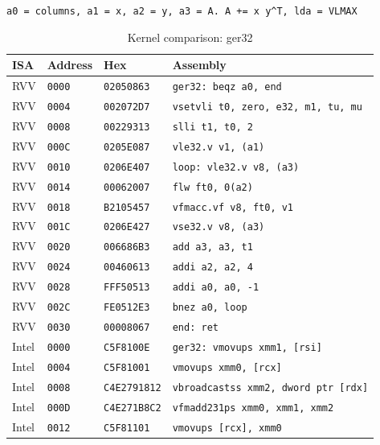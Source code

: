\begin{table}[htbp]
\centering
\caption{Kernel comparison: ger32}
\begingroup
\scriptsize
\setlength{\tabcolsep}{4pt}
\noindent \texttt{a0 = columns, a1 = x, a2 = y, a3 = A. A += x y\textasciicircum{}T, lda = VLMAX}\par
\vspace{0.6ex}
\begin{tabular}{@{}l|l|l|p{7.2cm}@{}}
\toprule
ISA & Address & Hex & Assembly \\
\midrule
RVV & \texttt{0000} & \texttt{02050863} & \texttt{ger32: beqz a0, end} \\
RVV & \texttt{0004} & \texttt{002072D7} & \texttt{vsetvli t0, zero, e32, m1, tu, mu} \\
RVV & \texttt{0008} & \texttt{00229313} & \texttt{slli t1, t0, 2} \\
RVV & \texttt{000C} & \texttt{0205E087} & \texttt{vle32.v v1, (a1)} \\
RVV & \texttt{0010} & \texttt{0206E407} & \texttt{loop: vle32.v v8, (a3)} \\
RVV & \texttt{0014} & \texttt{00062007} & \texttt{flw ft0, 0(a2)} \\
RVV & \texttt{0018} & \texttt{B2105457} & \texttt{vfmacc.vf v8, ft0, v1} \\
RVV & \texttt{001C} & \texttt{0206E427} & \texttt{vse32.v v8, (a3)} \\
RVV & \texttt{0020} & \texttt{006686B3} & \texttt{add a3, a3, t1} \\
RVV & \texttt{0024} & \texttt{00460613} & \texttt{addi a2, a2, 4} \\
RVV & \texttt{0028} & \texttt{FFF50513} & \texttt{addi a0, a0, -1} \\
RVV & \texttt{002C} & \texttt{FE0512E3} & \texttt{bnez a0, loop} \\
RVV & \texttt{0030} & \texttt{00008067} & \texttt{end: ret} \\
\midrule
Intel & \texttt{0000} & \texttt{C5F8100E} & \texttt{ger32: vmovups xmm1, [rsi]} \\
Intel & \texttt{0004} & \texttt{C5F81001} & \texttt{vmovups xmm0, [rcx]} \\
Intel & \texttt{0008} & \texttt{C4E2791812} & \texttt{vbroadcastss xmm2, dword ptr [rdx]} \\
Intel & \texttt{000D} & \texttt{C4E271B8C2} & \texttt{vfmadd231ps xmm0, xmm1, xmm2} \\
Intel & \texttt{0012} & \texttt{C5F81101} & \texttt{vmovups [rcx], xmm0} \\

\end{tabular}
\end{table}
